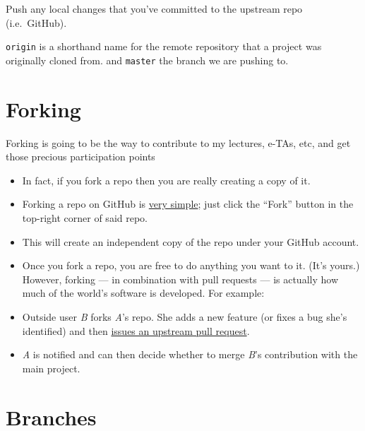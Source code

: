 \documentclass[
]{article}
\newenvironment{Shaded}{\begin{snugshade}}{\end{snugshade}}
\newcommand{\FunctionTok}[1]{\textcolor[rgb]{0.00,0.00,0.00}{#1}}
\newcommand{\NormalTok}[1]{#1}
\begin{document}
Push any local changes that you've committed to the upstream repo
(i.e.~GitHub).

\begin{Shaded}
\end{Shaded}

\texttt{origin} is a shorthand name for the remote repository that a
project was originally cloned from. and \texttt{master} the branch we
are pushing to.

\hypertarget{forking}{%
\section{Forking}\label{forking}}

Forking is going to be the way to contribute to my lectures, e-TAs, etc,
and get those precious participation points

\begin{itemize}
\item
  In fact, if you fork a repo then you are really creating a copy of it.
\item
  Forking a repo on GitHub is
  \href{https://help.github.com/articles/fork-a-repo/}{very simple};
  just click the ``Fork'' button in the top-right corner of said repo.
\item
  This will create an independent copy of the repo under your GitHub
  account.
\item
  Once you fork a repo, you are free to do anything you want to it.
  (It's yours.) However, forking --- in combination with pull requests
  --- is actually how much of the world's software is developed. For
  example:
\item
  Outside user \emph{B} forks \emph{A}'s repo. She adds a new feature
  (or fixes a bug she's identified) and then
  \href{https://help.github.com/articles/creating-a-pull-request-from-a-fork/}{issues
  an upstream pull request}.
\item
  \emph{A} is notified and can then decide whether to merge \emph{B}'s
  contribution with the main project.
\end{itemize}

\hypertarget{branches}{%
\section{Branches}\label{branches}}
\end{document}
